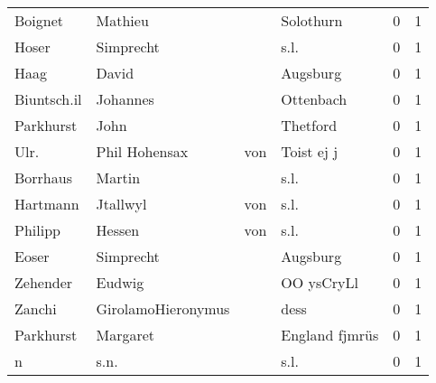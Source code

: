 \begin{tabular}{llllrr}
                  Boignet &                            Mathieu &             &                                   Solothurn &          0 &         1 \\
                    Hoser &                          Simprecht &             &                                        s.l. &          0 &         1 \\
                     Haag &                              David &             &                                    Augsburg &          0 &         1 \\
              Biuntsch.il &                           Johannes &             &                                   Ottenbach &          0 &         1 \\
                Parkhurst &                               John &             &                                    Thetford &          0 &         1 \\
                     Ulr. &                     Phil  Hohensax &         von &                                  Toist ej j &          0 &         1 \\
                 Borrhaus &                             Martin &             &                                        s.l. &          0 &         1 \\
                 Hartmann &                           Jtallwyl &         von &                                        s.l. &          0 &         1 \\
                  Philipp &                             Hessen &         von &                                        s.l. &          0 &         1 \\
                    Eoser &                          Simprecht &             &                                    Augsburg &          0 &         1 \\
                 Zehender &                             Eudwig &             &                                  OO ysCryLl &          0 &         1 \\
                   Zanchi &                 GirolamoHieronymus &             &                                        dess &          0 &         1 \\
                Parkhurst &                           Margaret &             &                              England fjmrüs &          0 &         1 \\
                        n &                               s.n. &             &                                        s.l. &          0 &         1 \\

\end{tabular}
